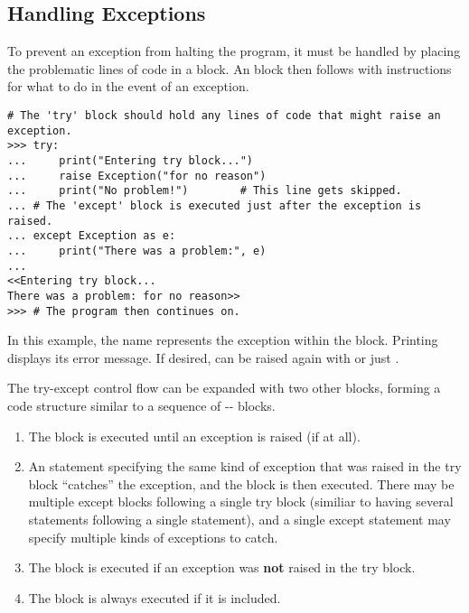 \subsection*{Handling Exceptions} %

To prevent an exception from halting the program, it must be handled by
placing the problematic lines of code in a  block.
An  block then follows with instructions for what to do in the event of an exception.

\begin{lstlisting}
# The 'try' block should hold any lines of code that might raise an exception.
>>> try:
...     print("Entering try block...")
...     raise Exception("for no reason")
...     print("No problem!")        # This line gets skipped.
... # The 'except' block is executed just after the exception is raised.
... except Exception as e:
...     print("There was a problem:", e)
...
<<Entering try block...
There was a problem: for no reason>>
>>> # The program then continues on.
\end{lstlisting}

In this example, the name  represents the exception within the  block.
Printing  displays its error message.
If desired,  can be raised again with  or just .

The try-except control flow can be expanded with two other blocks, forming a code structure similar to a sequence of -- blocks.
%
\begin{enumerate}
\item The  block is executed until an exception is raised (if at all).

\item An  statement specifying the same kind of exception that was raised in the try block ``catches'' the exception, and the block is then executed.
There may be multiple except blocks following a single try block (similiar to having several  statements following a single  statement), and a single except statement may specify multiple kinds of exceptions to catch.

\item The  block is executed if an exception was \textbf{not} raised in the try block.

\item The  block is always executed if it is included.
\end{enumerate}

